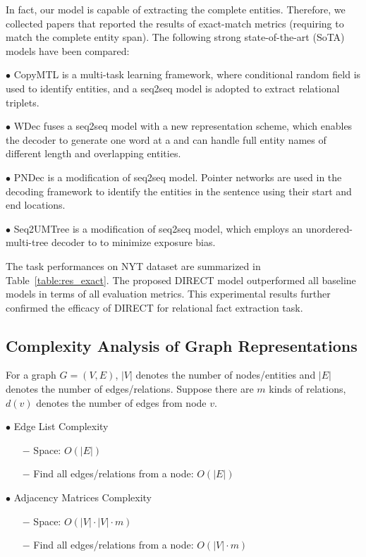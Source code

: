 \documentclass[11pt,a4paper]{article}
\begin{document}
In fact, our model is capable of extracting the complete entities. Therefore, we collected papers that reported the results of exact-match metrics (requiring to match the complete entity span). The following strong state-of-the-art (SoTA) models have been compared: 

$\bullet$ CopyMTL \cite{zeng2020copymtl} is a multi-task learning framework, where conditional random ﬁeld is used to identify entities, and a seq2seq model is adopted to extract relational triplets.

$\bullet$ WDec \cite{nayak2020effective} fuses a seq2seq model with a new representation scheme, which enables the decoder to generate one word at a and can handle full entity names of different length and overlapping entities.

$\bullet$ PNDec \cite{nayak2020effective} is a modiﬁcation of seq2seq model. Pointer networks are used in the decoding framework to identify the entities in the sentence using their start and end locations.

$\bullet$ Seq2UMTree \cite{zhang2020minimize} is a modiﬁcation of seq2seq model, which employs an unordered-multi-tree decoder to to minimize exposure bias.

The task performances on NYT dataset are summarized in Table~\ref{table:res_exact}. The proposed DIRECT model outperformed all baseline models in terms of all evaluation metrics. This experimental results further confirmed the efficacy of DIRECT for relational fact extraction task. 

\subsection{Complexity Analysis of Graph Representations}\label{ass:cagr}
For a graph $G=(V,E)$, $|V|$ denotes the number of nodes/entities and $|E|$ denotes the number of edges/relations. Suppose there are $m$ kinds of relations, $d(v)$ denotes the number of edges from node $v$.

$\bullet$  Edge List Complexity
    \begin{enumerate}
    	\item[$-$] Space: $O(|E|)$
        \item[$-$] Find all edges/relations from a node: $O(|E|)$
    \end{enumerate}
    
$\bullet$  Adjacency Matrices Complexity
    \begin{enumerate}
    	\item[$-$] Space: $O(|V| \cdot |V| \cdot m)$
        \item[$-$] Find all edges/relations from a node: $O(|V| \cdot m)$
    \end{enumerate}
\end{document}
